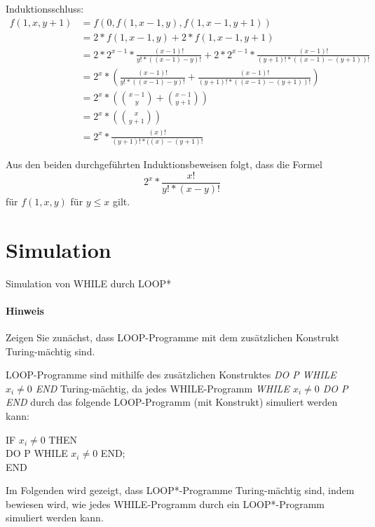 \documentclass[10pt,leqno ]{article}
\begin{document}
Induktionsschluss:
\begin{align*}
f(1,x,y+1) &= f(0, f(1,x-1,y), f(1,x-1,y+1)) \\
           &= 2 * f(1,x-1,y) + 2 * f(1,x-1,y+1) \\
           &= 2 * 2^{x-1} * \frac{(x-1)!}{y! * ((x-1) - y)!} + 2 * 2^{x-1} * \frac{(x-1)!}{(y+1)! * ((x-1) - (y+1))!} \\ %
           &= 2^x * (\frac{(x-1)!}{y! * ((x-1) - y)!} + \frac{(x-1)!}{(y+1)! * ((x-1) - (y+1))!}) \\
           &= 2^x * ( \binom{x-1}{y} + \binom{x-1}{y+1}) \\
           &= 2^x * ( \binom{x}{y+1}) \\
           &= 2^x * \frac{(x)!}{(y+1)! * ((x) - (y+1)!}
\end{align*}

\vspace{1cm}
\begin{flushleft}
    Aus den beiden durchgeführten Induktionsbeweisen folgt, dass die Formel 
    \[ 2^x * \frac{x!}{y! * (x - y)!} \]
    für $f(1,x,y)$ für $y \le x$ gilt.
\end{flushleft}

\pagebreak

\section{Simulation}

Simulation von WHILE durch LOOP*

\paragraph{Hinweis}
Zeigen Sie zunächst, dass LOOP-Programme mit dem zusätzlichen Konstrukt
Turing-mächtig sind.
    
LOOP-Programme sind mithilfe des zusätzlichen Konstruktes \textit{DO P WHILE  $x_i \neq 0$ END} Turing-mächtig, da jedes WHILE-Programm \textit{WHILE $x_i \neq 0$ DO P END} durch das folgende LOOP-Programm (mit Konstrukt) simuliert werden kann:

\begin{flushleft}
IF $x_i \neq 0$ THEN \\ 
\quad    DO P WHILE $x_i \neq 0$ END; \\ 
END
\end{flushleft}

Im Folgenden wird gezeigt, dass LOOP*-Programme Turing-mächtig sind, indem bewiesen wird, wie jedes WHILE-Programm durch ein LOOP*-Programm simuliert werden kann.
\end{document}
